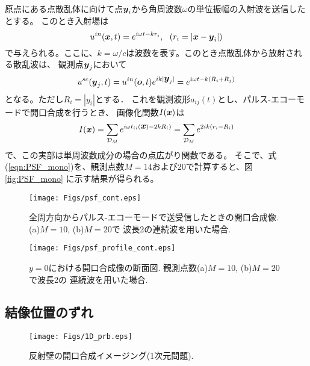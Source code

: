 \documentclass[10pt,a4j,dvipdfmx]{jarticle}
\begin{document}
原点にある点散乱体に向けて点$\mbox{\boldmath $y$}_i$から角周波数$\omega$の単位振幅の入射波を送信したとする。
このとき入射場は
\begin{equation}
	u^{in}(\fat{x},t)=e^{i\omega t-kr_i}, \ \ (r_i=\left| \fat{x}-\fat{y}_i\right|)
	\label{eqn:}
\end{equation}
で与えられる。ここに、$k=\omega/c$は波数を表す。このとき点散乱体から放射される散乱波は、
観測点$\mbox{\boldmath $y$}_j$において
\begin{equation}
	u^{sc}(\mbox{\boldmath $y$}_j,t)=
	u^{in}(\mbox{\boldmath $o$},t)e^{i k|\mbox{\boldmath $y$}_j|}
	=e^{i\omega t -k(R_i+R_j)}
	\label{eqn:}
\end{equation}
となる。ただし$R_i=\left| y_i\right|$とする．
これを観測波形$a_{ij}(t)$とし、パルス-エコーモードで開口合成を行うとき、
画像化関数$I(\mbox{\boldmath $x$})$は
\begin{equation}
	I(\mbox{\boldmath $x$}) =
	\sum_{{\cal D}_M} 
		e^{i\omega t_{ii}(\mbox{\boldmath $x$}) -2kR_i)}
	=
	\sum_{{\cal D}_M} 
		e^{2ik(r_i-R_i)}
	\label{eqn:PSF_mono}
\end{equation}
で、この実部は単周波数成分の場合の点広がり関数である。
そこで、式(\ref{eqn:PSF_mono})を、観測点数$M=14$および20で計算すると、図\ref{fig:PSF_mono}
に示す結果が得られる。
\begin{figure}[h]
	\begin{center}
	\texttt{[image: Figs/psf\_cont.eps]} 
	\end{center}
	\caption{全周方向からパルス-エコーモードで送受信したときの開口合成像.(a)$M=10$, (b)$M=20$で
	波長2の連続波を用いた場合.} 
	\label{fig:}
\end{figure}
\begin{figure}[h]
	\begin{center}
	\texttt{[image: Figs/psf\_profile\_cont.eps]} 
	\end{center}
	\caption{$y=0$における開口合成像の断面図. 観測点数(a)$M=10$, (b)$M=20$で波長2の
	連続波を用いた場合.}
	\label{fig:}
\end{figure}

\subsection{結像位置のずれ}
\begin{figure}[h]
	\begin{center}
	\texttt{[image: Figs/1D\_prb.eps]} 
	\end{center}
	\caption{反射壁の開口合成イメージング(1次元問題).} 
	\label{fig:1D_prb}
\end{figure}
\end{document}
